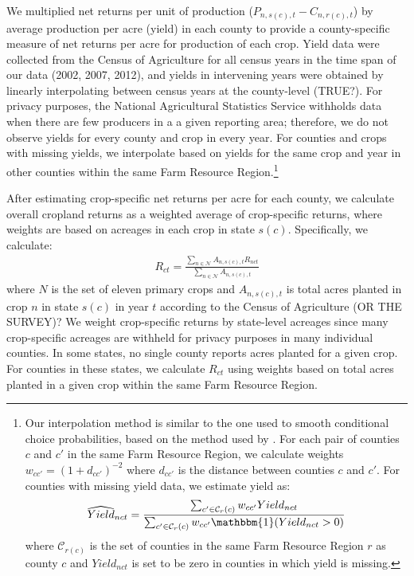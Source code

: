 \documentclass[11pt]{article}
\begin{document}
We multiplied net returns per unit of production ($P_{n,s(c),t} - C_{n,r(c),t}$) by average production per acre (yield) in each county to provide a county-specific measure of net returns per acre for production of each crop. Yield data were collected from the Census of Agriculture for all census years in the time span of our data (2002, 2007, 2012), and yields in intervening years were obtained by linearly interpolating between census years at the county-level (TRUE?). For privacy purposes, the National Agricultural Statistics Service withholds data when there are few producers in a a given reporting area; therefore, we do not observe yields for every county and crop in every year. For counties and crops with missing yields, we interpolate based on yields for the same crop and year in other counties within the same Farm Resource Region.\footnote{Our interpolation method is similar to the one used to smooth conditional choice probabilities, based on the method used by \citet{scott2014}. For each pair of counties $c$ and $c'$ in the same Farm Resource Region, we calculate weights $w_{cc'} = (1+d_{cc'})^{-2}$ where $d_{cc'}$ is the distance between counties $c$ and $c'$. For counties with missing yield data, we estimate yield as:
\begin{align}
\widehat{Yield}_{nct} = \frac{\sum_{c' \in \mathcal{C}_r(c)} w_{cc'} Yield_{nct}}{\sum_{c' \in \mathcal{C}_r(c)} w_{cc'} \mathbbm{1}(Yield_{nct} > 0)}
\end{align}
where $\mathcal{C}_{r(c)}$ is the set of counties in the same Farm Resource Region $r$ as county $c$ and $Yield_{nct}$ is set to be zero in counties in which yield is missing.}

After estimating crop-specific net returns per acre for each county, we calculate overall cropland returns as a weighted average of crop-specific returns, where weights are based on acreages in each crop in state $s(c)$. Specifically, we calculate:
\begin{align}
R_{ct} = \frac{\sum_{n \in \mathcal{N}} A_{n,s(c),t} R_{nct}}{\sum_{n \in \mathcal{N}} A_{n,s(c),t}}
\end{align}
where $N$ is the set of eleven primary crops and $A_{n,s(c),t}$ is total acres planted in crop $n$ in state $s(c)$ in year $t$ according to the Census of Agriculture (OR THE SURVEY)? We weight crop-specific returns by state-level acreages since many crop-specific acreages are withheld for privacy purposes in many individual counties. In some states, no single county reports acres planted for a given crop. For counties in these states, we calculate $R_{ct}$ using weights based on total acres planted in a given crop within the same Farm Resource Region.
\end{document}
